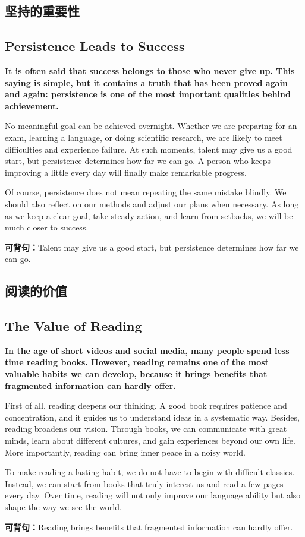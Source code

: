 ﻿\documentclass[UTF8,zihao=-4]{ctexart}
\newenvironment{essayblock}{\Needspace{0.46\textheight}\begin{samepage}}{\end{samepage}\vspace{0.2em}}
\newcommand{\essay}[3]{\section{#1}\subsection{#2}\textbf{#3}\par}
\newcommand{\keysentence}[1]{\begin{sentbox}\textbf{可背句：}#1\end{sentbox}}
\begin{document}
\begin{essayblock}
\essay{坚持的重要性}{Persistence Leads to Success}{It is often said that success belongs to those who never give up. This saying is simple, but it contains a truth that has been proved again and again: persistence is one of the most important qualities behind achievement.}

No meaningful goal can be achieved overnight. Whether we are preparing for an exam, learning a language, or doing scientific research, we are likely to meet difficulties and experience failure. At such moments, talent may give us a good start, but persistence determines how far we can go. A person who keeps improving a little every day will finally make remarkable progress.

Of course, persistence does not mean repeating the same mistake blindly. We should also reflect on our methods and adjust our plans when necessary. As long as we keep a clear goal, take steady action, and learn from setbacks, we will be much closer to success.

\keysentence{Talent may give us a good start, but persistence determines how far we can go.}
\end{essayblock}

\begin{essayblock}
\essay{阅读的价值}{The Value of Reading}{In the age of short videos and social media, many people spend less time reading books. However, reading remains one of the most valuable habits we can develop, because it brings benefits that fragmented information can hardly offer.}

First of all, reading deepens our thinking. A good book requires patience and concentration, and it guides us to understand ideas in a systematic way. Besides, reading broadens our vision. Through books, we can communicate with great minds, learn about different cultures, and gain experiences beyond our own life. More importantly, reading can bring inner peace in a noisy world.

To make reading a lasting habit, we do not have to begin with difficult classics. Instead, we can start from books that truly interest us and read a few pages every day. Over time, reading will not only improve our language ability but also shape the way we see the world.

\keysentence{Reading brings benefits that fragmented information can hardly offer.}
\end{essayblock}
\end{document}
